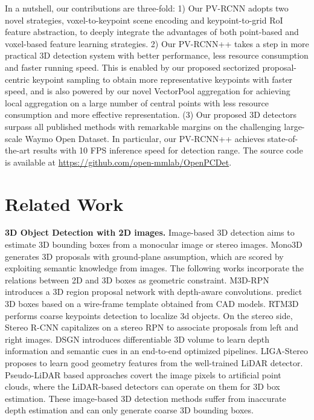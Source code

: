 \documentclass[natbib,twocolumn]{svjour3}          \smartqed  \usepackage{graphicx}
\begin{document}
In a nutshell, our contributions are three-fold:
1) Our PV-RCNN adopts two novel strategies, voxel-to-keypoint scene encoding and keypoint-to-grid RoI feature abstraction, to deeply integrate the advantages of both point-based and voxel-based feature learning strategies. 
2) Our PV-RCNN++ takes a step in more practical 3D detection system with better performance, less resource consumption and faster running speed. This is enabled by our proposed sectorized proposal-centric keypoint sampling to obtain more representative keypoints with faster speed, and is also powered by our novel VectorPool aggregation for achieving local aggregation on a large number of central points with less resource consumption and more effective representation. 
(3) Our proposed 3D detectors surpass all published methods with remarkable margins on the challenging large-scale Waymo Open Dataset.
In particular, our PV-RCNN++ achieves state-of-the-art results with 10 FPS inference speed for  detection range.
The source code is available at \url{https://github.com/open-mmlab/OpenPCDet}. 



\section{Related Work}
\noindent
\textbf{3D Object Detection with 2D images.} Image-based 3D detection aims to estimate 3D bounding boxes from a monocular image or stereo images.
Mono3D \citep{chen2016monocular} generates 3D proposals with ground-plane assumption, which are scored by exploiting semantic knowledge from images. 
The following works \citep{mousavian20173d,li2019gs3d} incorporate the relations between 2D and 3D boxes as geometric constraint. M3D-RPN \citep{brazil2019m3d} introduces a 3D region proposal network with depth-aware convolutions. \citep{chabot2017deep,murthy2017reconstructing,manhardt2019roi} predict 3D boxes based on a wire-frame template obtained from CAD models. 
RTM3D \citep{li2020rtm3d} 
performs coarse keypoints detection to localize 3d objects.
On the stereo side, Stereo R-CNN \citep{li2019stereo,qian2020end} capitalizes on a stereo RPN to associate proposals from left and right images. 
DSGN \citep{chen2020dsgn} introduces differentiable 3D volume to learn depth information and semantic cues in an end-to-end optimized pipelines. 
LIGA-Stereo \citep{guo2021liga} proposes to learn good geometry features from the well-trained LiDAR detector. 
Pseudo-LiDAR based approaches \citep{wang2019pseudo,qian2020end,you2020pseudo} covert the image pixels to artificial point clouds, where the LiDAR-based detectors can operate on them for 3D box estimation. 
These image-based 3D detection methods suffer from inaccurate depth estimation and can only generate coarse 3D bounding boxes. 
\end{document}
